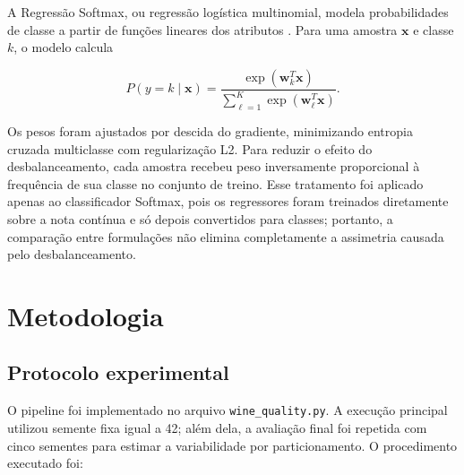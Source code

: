 \documentclass[12pt,a4paper]{article}
\begin{document}
A Regress\~ao Softmax, ou regress\~ao log\'istica multinomial, modela probabilidades de classe a partir de fun\c{c}\~oes lineares dos atributos \cite{bishop2006pattern}. Para uma amostra $\mathbf{x}$ e classe $k$, o modelo calcula

\begin{equation}
P(y=k \mid \mathbf{x}) =
\frac{\exp(\mathbf{w}_k^{T}\mathbf{x})}
{\sum_{\ell=1}^{K}\exp(\mathbf{w}_{\ell}^{T}\mathbf{x})}.
\label{eq:softmax}
\end{equation}

Os pesos foram ajustados por descida do gradiente, minimizando entropia cruzada multiclasse com regulariza\c{c}\~ao L2. Para reduzir o efeito do desbalanceamento, cada amostra recebeu peso inversamente proporcional \`a frequ\^encia de sua classe no conjunto de treino. Esse tratamento foi aplicado apenas ao classificador Softmax, pois os regressores foram treinados diretamente sobre a nota cont\'inua e s\'o depois convertidos para classes; portanto, a compara\c{c}\~ao entre formula\c{c}\~oes n\~ao elimina completamente a assimetria causada pelo desbalanceamento.

\section{Metodologia}
\label{sec:metodologia}

\subsection{Protocolo experimental}
\label{subsec:protocolo}

O pipeline foi implementado no arquivo \texttt{wine\_quality.py}. A execu\c{c}\~ao principal utilizou semente fixa igual a 42; al\'em dela, a avalia\c{c}\~ao final foi repetida com cinco sementes para estimar a variabilidade por particionamento. O procedimento executado foi:
\end{document}
